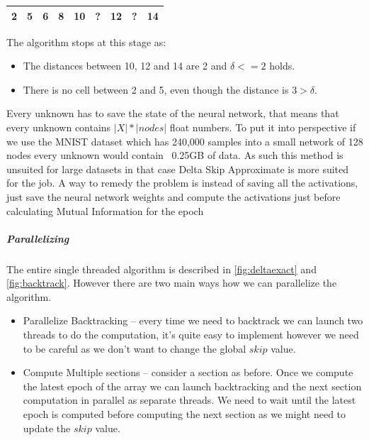 \documentclass[dissertation.tex]{subfiles}
\begin{document}
  \begin{table}[H]
    \centering
      \begin{tabular}{|c|c|c|c|c|c|c|c|c|}
      \hline			
        2&\bf{5}&6&\bf{8}&10&?&12&?&14\\
      \hline  
    \end{tabular}
  \end{table}

  The algorithm stops at this stage as:
  \begin{itemize}
    \item{
        The distances between 10, 12 and 14 are 2 and $\delta <= 2$ holds.
      }
    \item{
        There is no cell between 2 and 5, even though the distance is $3 >
        \delta$.
      }
  \end{itemize}

  Every unknown has to save the state of the neural network, that means that
  every unknown contains $|X|*|nodes|$ float numbers. To put it into perspective
  if we use the MNIST dataset which has 240,000 samples into a small network of
  128 nodes every unknown would contain ~0.25GB of data. As such this method is
  unsuited for large datasets in that case Delta Skip Approximate is more suited
  for the job. A way to remedy the problem is instead of saving all the
  activations, just save the neural network weights and compute the activations
  just before calculating Mutual Information for the epoch
  
  \subparagraph{Parallelizing} 
  The entire single threaded algorithm is described in \autoref{fig:deltaexact}
  and \autoref{fig:backtrack}. However there are two main ways how we can
  parallelize the algorithm.
  \begin{itemize}
    \item{
        Parallelize Backtracking -- every time we need to backtrack we can
        launch two threads to do the computation, it's quite easy to implement
        however we need to be careful as we don't want to change the global
        $skip$ value.
      }
    \item{
        Compute Multiple sections -- consider a section as before.
        Once we compute the latest epoch of the array we can launch backtracking
        and the next section computation in parallel as separate threads.
        We need to wait until the latest epoch is computed before computing the
        next section as we might need to
        update the $skip$ value.
      }
  \end{itemize}
\end{document}
